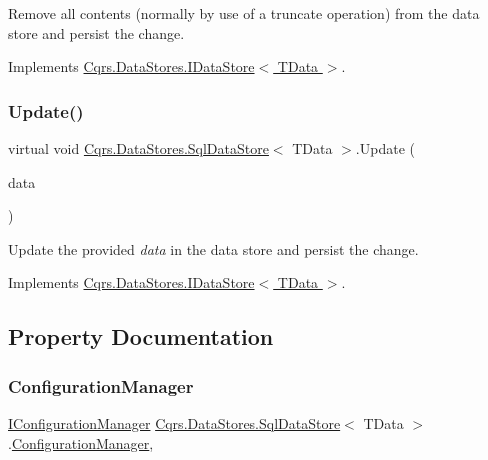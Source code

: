 Remove all contents (normally by use of a truncate operation) from the data store and persist the change. 



Implements \hyperlink{interfaceCqrs_1_1DataStores_1_1IDataStore_aead8d7a39a717d29af05daf7b64bea94}{Cqrs.\+Data\+Stores.\+I\+Data\+Store$<$ T\+Data $>$}.

\mbox{\label{classCqrs_1_1DataStores_1_1SqlDataStore_a8f85191cecef92d003620d4064584bb2}} 
\subsubsection{\texorpdfstring{Update()}{Update()}}
{\footnotesize\ttfamily virtual void \hyperlink{classCqrs_1_1DataStores_1_1SqlDataStore}{Cqrs.\+Data\+Stores.\+Sql\+Data\+Store}$<$ T\+Data $>$.Update (\begin{DoxyParamCaption}\item[{T\+Data}]{data }\end{DoxyParamCaption})\hspace{0.3cm}{\ttfamily [virtual]}}



Update the provided {\itshape data}  in the data store and persist the change. 



Implements \hyperlink{interfaceCqrs_1_1DataStores_1_1IDataStore_a6d5d4dd572de8db01ff0c48d37faefa7}{Cqrs.\+Data\+Stores.\+I\+Data\+Store$<$ T\+Data $>$}.



\subsection{Property Documentation}
\mbox{\label{classCqrs_1_1DataStores_1_1SqlDataStore_a9d720406a3c3abbd8bf1924bd81874ac}} 
\subsubsection{\texorpdfstring{Configuration\+Manager}{ConfigurationManager}}
{\footnotesize\ttfamily \hyperlink{interfaceCqrs_1_1Configuration_1_1IConfigurationManager}{I\+Configuration\+Manager} \hyperlink{classCqrs_1_1DataStores_1_1SqlDataStore}{Cqrs.\+Data\+Stores.\+Sql\+Data\+Store}$<$ T\+Data $>$.\hyperlink{classCqrs_1_1Configuration_1_1ConfigurationManager}{Configuration\+Manager}\hspace{0.3cm}{\ttfamily [get]}, {\ttfamily [protected]}}





